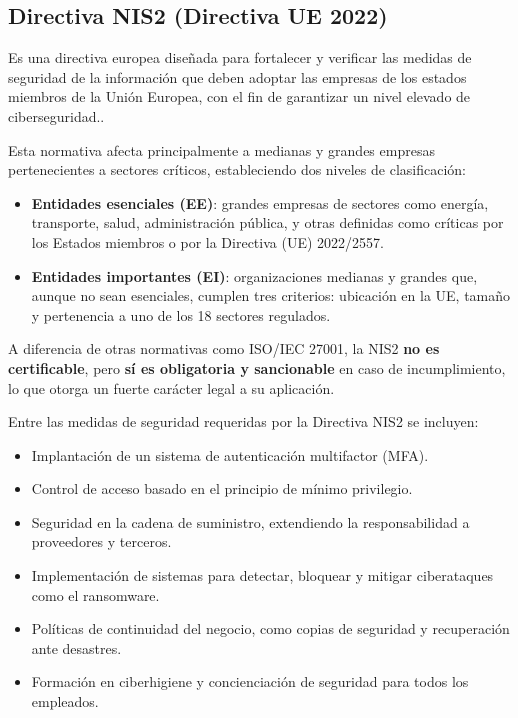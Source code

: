 \documentclass[a4paper, 11pt]{article}
\begin{document}
\subsection*{Directiva NIS2 (Directiva UE 2022)}
Es una directiva europea diseñada para fortalecer y verificar las medidas de seguridad de la información que deben adoptar las empresas de los estados miembros de la Unión Europea, con el fin de garantizar un nivel elevado de ciberseguridad.\cite{nis2}.
\par\vspace{0.5cm}

Esta normativa afecta principalmente a medianas y grandes empresas pertenecientes a sectores críticos, estableciendo dos niveles de clasificación:
\begin{itemize}
\item \textbf{Entidades esenciales (EE)}: grandes empresas de sectores como energía, transporte, salud, administración pública, y otras definidas como críticas por los Estados miembros o por la Directiva (UE) 2022/2557.
\item \textbf{Entidades importantes (EI)}: organizaciones medianas y grandes que, aunque no sean esenciales, cumplen tres criterios: ubicación en la UE, tamaño y pertenencia a uno de los 18 sectores regulados.
\end{itemize}

A diferencia de otras normativas como ISO/IEC 27001, la NIS2 \textbf{no es certificable}, pero \textbf{sí es obligatoria y sancionable} en caso de incumplimiento, lo que otorga un fuerte carácter legal a su aplicación.
\par\vspace{0.5cm}

Entre las medidas de seguridad requeridas por la Directiva NIS2 se incluyen:
\begin{itemize}
\item Implantación de un sistema de autenticación multifactor (MFA).
\item Control de acceso basado en el principio de mínimo privilegio.
\item Seguridad en la cadena de suministro, extendiendo la responsabilidad a proveedores y terceros.
\item Implementación de sistemas para detectar, bloquear y mitigar ciberataques como el ransomware.
\item Políticas de continuidad del negocio, como copias de seguridad y recuperación ante desastres.
\item Formación en ciberhigiene y concienciación de seguridad para todos los empleados.
\end{itemize}
\end{document}
